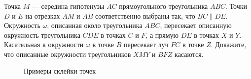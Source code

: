 \documentclass{article}
\begin{document}
\begin{enumerate_boxed}
		\item Точка $M$ — середина гипотенузы $AC$ прямоугольного треугольника $ABC$.
		Точки $D$ и $E$ на отрезках $AM$ и $AB$ соответственно выбраны так, что $BC \parallel DE$.
		Окружность $\omega$, описанная около треугольника $ABC$, пересекает описанную окружность треугольника $CDE$ в точках $C$ и $F$, а прямую $DE$ в точках $X$ и $Y$.
		Касательная к окружности $\omega$ в точке $B$ пересекает луч $FC$ в точке $Z$.
		Докажите, что описанные окружности треугольников $XMY$ и $BFZ$ касаются.
		
	\end{enumerate_boxed}
	
	\begin{figure}[h]
		\caption{Примеры склейки точек}\label{fig:figure}
	\end{figure}
\end{document}
